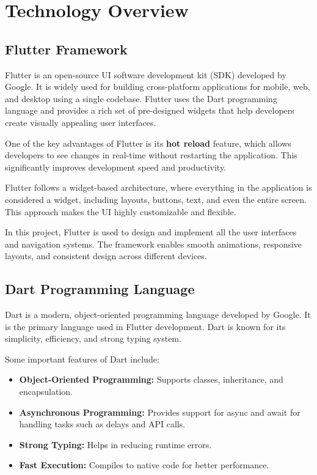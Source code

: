 \documentclass{article}
\begin{document}

\section{Technology Overview}

\subsection{Flutter Framework}

Flutter is an open-source UI software development kit (SDK) developed by Google. It is widely used for building cross-platform applications for mobile, web, and desktop using a single codebase. Flutter uses the Dart programming language and provides a rich set of pre-designed widgets that help developers create visually appealing user interfaces.

One of the key advantages of Flutter is its \textbf{hot reload} feature, which allows developers to see changes in real-time without restarting the application. This significantly improves development speed and productivity.

Flutter follows a widget-based architecture, where everything in the application is considered a widget, including layouts, buttons, text, and even the entire screen. This approach makes the UI highly customizable and flexible.

In this project, Flutter is used to design and implement all the user interfaces and navigation systems. The framework enables smooth animations, responsive layouts, and consistent design across different devices.

\subsection{Dart Programming Language}

Dart is a modern, object-oriented programming language developed by Google. It is the primary language used in Flutter development. Dart is known for its simplicity, efficiency, and strong typing system.

Some important features of Dart include:

\begin{itemize}
\item \textbf{Object-Oriented Programming:} Supports classes, inheritance, and encapsulation.
\item \textbf{Asynchronous Programming:} Provides support for async and await for handling tasks such as delays and API calls.
\item \textbf{Strong Typing:} Helps in reducing runtime errors.
\item \textbf{Fast Execution:} Compiles to native code for better performance.
\end{itemize}
\end{document}
